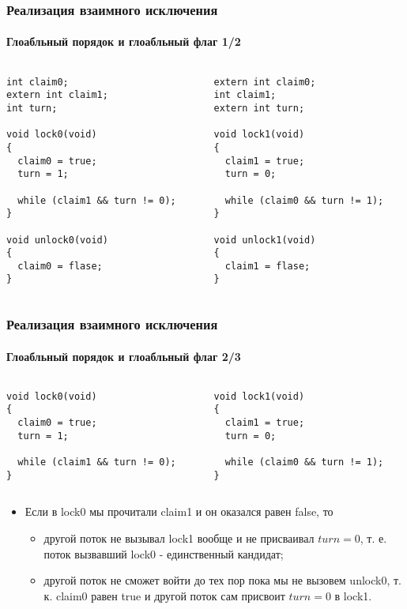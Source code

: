 \begin{frame}[fragile]
\frametitle{Реализация взаимного исключения}
\framesubtitle{Глоабльный порядок и глоабльный флаг 1/2}
\begin{columns}
  \begin{column}{.45\linewidth}
    \begin{lstlisting}
int claim0;
extern int claim1;
int turn;

void lock0(void)
{
  claim0 = true;
  turn = 1;

  while (claim1 && turn != 0);
}

void unlock0(void)
{
  claim0 = flase;
}
    \end{lstlisting}
  \end{column}
  \begin{column}{.45\linewidth}
    \begin{lstlisting}
extern int claim0;
int claim1;
extern int turn;

void lock1(void)
{
  claim1 = true;
  turn = 0;

  while (claim0 && turn != 1);
}

void unlock1(void)
{
  claim1 = flase;
}
    \end{lstlisting}
  \end{column}
\end{columns}
\end{frame}

\begin{frame}[fragile]
\frametitle{Реализация взаимного исключения}
\framesubtitle{Глоабльный порядок и глоабльный флаг 2/3}
\begin{columns}
  \begin{column}{.45\linewidth}
    \begin{lstlisting}
void lock0(void)
{
  claim0 = true;
  turn = 1;

  while (claim1 && turn != 0);
}
    \end{lstlisting}
  \end{column}
  \begin{column}{.45\linewidth}
    \begin{lstlisting}
void lock1(void)
{
  claim1 = true;
  turn = 0;

  while (claim0 && turn != 1);
}
    \end{lstlisting}
  \end{column}
\end{columns}
\begin{itemize}
  \item Если в lock0 мы прочитали claim1 и он оказался равен false, то
  \begin{itemize}
    \item другой поток не вызывал lock1 вообще и не присваивал $turn = 0$,
    т. е. поток вызвавший lock0 - единственный кандидат;
    \item другой поток не сможет войти до тех пор пока мы не вызовем unlock0,
    т. к. claim0 равен true и другой поток сам присвоит $turn = 0$ в lock1.
  \end{itemize}
\end{itemize}
\end{frame}

